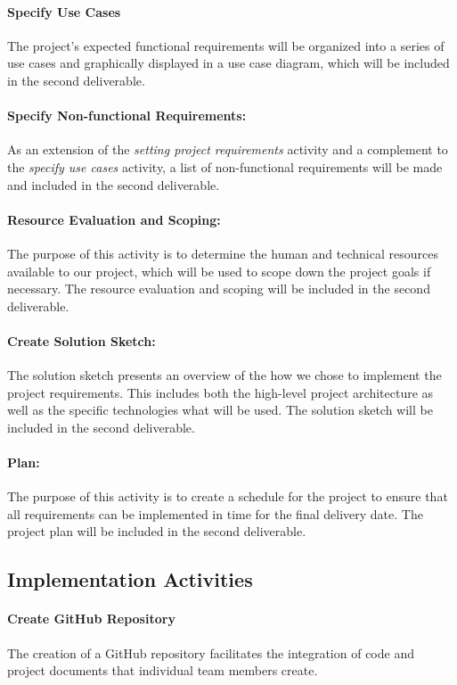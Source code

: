 \documentclass[12pt]{article}
\begin{document}
\paragraph*{Specify Use Cases}The project's expected functional requirements will be organized into a series of use cases and graphically displayed in a use case diagram, which will be included in the second deliverable.

\paragraph*{Specify Non-functional Requirements:}As an extension of the \emph{setting project requirements} activity and a complement to the \emph{specify use cases} activity, a list of non-functional requirements will be made and included in the second deliverable.

\paragraph*{Resource Evaluation and Scoping:}The purpose of this activity is to determine the human and technical resources available to our project, which will be used to scope down the project goals if necessary. The resource evaluation and scoping will be included in the second deliverable.

\paragraph*{Create Solution Sketch:}The solution sketch presents an overview of the how we chose to implement the project requirements. This includes both the high-level project architecture as well as the specific technologies what will be used. The solution sketch will be included in the second deliverable.

\paragraph*{Plan:}The purpose of this activity is to create a schedule for the project to ensure that all requirements can be implemented in time for the final delivery date. The project plan will be included in the second deliverable.

\subsection*{Implementation Activities}
\paragraph*{Create GitHub Repository}The creation of a GitHub repository facilitates the integration of code and project documents that individual team members create.
\end{document}
